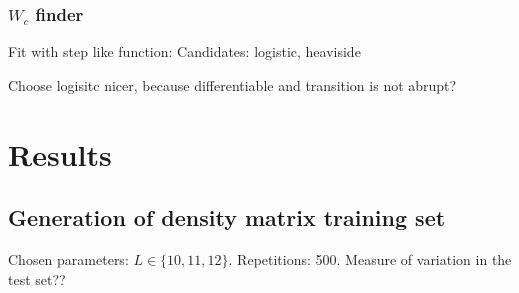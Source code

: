 \documentclass[reprint,amsmath,amssymb,aps,prb]{revtex4-2}
\begin{document}
\subsubsection{$W_c$ finder}


Fit with step like function: Candidates: logistic, heaviside

Choose logisitc nicer, because differentiable and transition is not abrupt?%




\section{Results}%

\subsection{Generation of density matrix training set}

Chosen parameters: $L \in \{10, 11, 12\}$. Repetitions: 500. Measure of variation in the test set??
\end{document}
